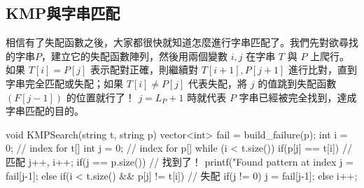 \subsection{KMP與字串匹配}

相信有了失配函數之後，大家都很快就知道怎麼進行字串匹配了。我們先對欲尋找的字串$P$，建立它的失配函數陣列，然後用兩個變數 $i, j$ 在字串 $T$ 與 $P$ 上爬行。\\

如果 $T[i] = P[j]$ 表示配對正確，則繼續對 $T[i+1], P[j+1]$ 進行比對，直到字串完全匹配或失配；如果 $T[i] \neq P[j]$ 代表失配，將 $j$ 的值跳到失配函數 $(F[j-1])$ 的位置就行了！ $j = L_P+1$ 時就代表 $P$ 字串已經被完全找到，達成字串匹配的目的。

\begin{C++}
void KMPSearch(string t, string p){
    vector<int> fail = build_failure(p);
    int i = 0; // index for t[]
    int j = 0; // index for p[]
    while (i < t.size()){
        if(p[j] == t[i]){ // 匹配
            j++, i++;
        }
        if(j == p.size()){ // 找到了！
            printf("Found pattern at index %
            j = fail[j-1];
        }
        else if(i < t.size() && p[j] != t[i]){ // 失配
            if(j != 0) j = fail[j-1];
            else i++;
        }
    }
}
\end{C++}

